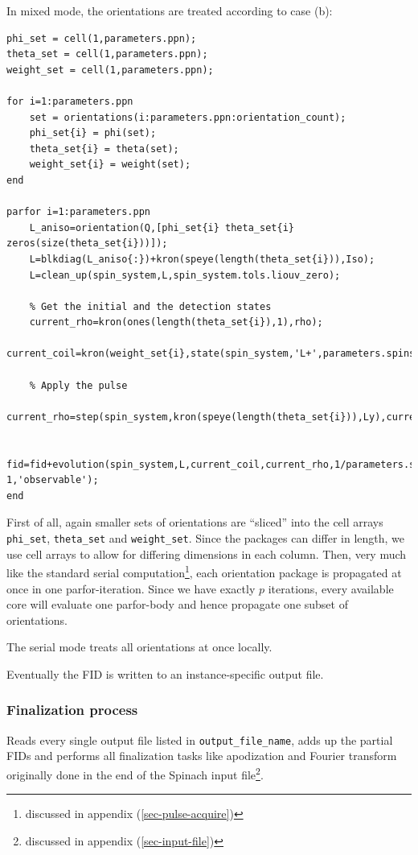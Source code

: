 \documentclass[11.5pt,a4paper]{article}
\begin{document}
In mixed mode, the orientations are treated according to case (b):
\begin{lstlisting}
phi_set = cell(1,parameters.ppn);
theta_set = cell(1,parameters.ppn);
weight_set = cell(1,parameters.ppn);

for i=1:parameters.ppn
    set = orientations(i:parameters.ppn:orientation_count);
    phi_set{i} = phi(set);
    theta_set{i} = theta(set);
    weight_set{i} = weight(set); 
end

parfor i=1:parameters.ppn
    L_aniso=orientation(Q,[phi_set{i} theta_set{i} zeros(size(theta_set{i}))]);
    L=blkdiag(L_aniso{:})+kron(speye(length(theta_set{i})),Iso);
    L=clean_up(spin_system,L,spin_system.tols.liouv_zero);

    % Get the initial and the detection states
    current_rho=kron(ones(length(theta_set{i}),1),rho);
    current_coil=kron(weight_set{i},state(spin_system,'L+',parameters.spins));

    % Apply the pulse
    current_rho=step(spin_system,kron(speye(length(theta_set{i})),Ly),current_rho,pi/2);
    
    fid=fid+evolution(spin_system,L,current_coil,current_rho,1/parameters.sweep,parameters.npoints-1,'observable');
end
\end{lstlisting}
First of all, again smaller sets of orientations are ``sliced'' into the cell arrays \verb$phi_set$, \verb$theta_set$ and \verb$weight_set$. Since the packages can differ in length, we use cell arrays to allow for differing dimensions in each column. Then, very much like the standard serial computation\footnote{discussed in appendix (\ref{sec-pulse-acquire})}, each orientation package is propagated at once in one parfor-iteration. Since we have exactly $p$ iterations, every available core will evaluate one parfor-body and hence propagate one subset of orientations. 

The serial mode treats all orientations at once locally.

Eventually the FID is written to an instance-specific output file.

\subsubsection{Finalization process}
Reads every single output file listed in \verb$output_file_name$, adds up the partial FIDs and performs all finalization tasks like apodization and Fourier transform originally done in the end of the Spinach input file\footnote{discussed in appendix (\ref{sec-input-file})}.
\end{document}
